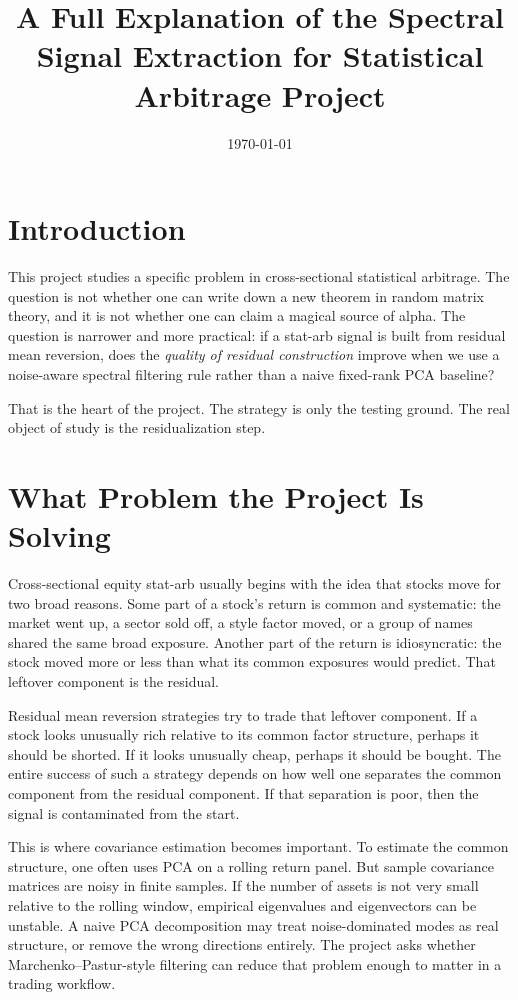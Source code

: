 \documentclass[11pt]{article}
\title{\textbf{A Full Explanation of the Spectral Signal Extraction for Statistical Arbitrage Project}}
\author{}
\date{\today}
\begin{document}
\maketitle
\thispagestyle{empty}

\section*{Introduction}

This project studies a specific problem in cross-sectional statistical
arbitrage. The question is not whether one can write down a new theorem in
random matrix theory, and it is not whether one can claim a magical source of
alpha. The question is narrower and more practical: if a stat-arb signal is
built from residual mean reversion, does the \emph{quality of residual
construction} improve when we use a noise-aware spectral filtering rule rather
than a naive fixed-rank PCA baseline?

That is the heart of the project. The strategy is only the testing ground. The
real object of study is the residualization step.

\section*{What Problem the Project Is Solving}

Cross-sectional equity stat-arb usually begins with the idea that stocks move
for two broad reasons. Some part of a stock's return is common and systematic:
the market went up, a sector sold off, a style factor moved, or a group of
names shared the same broad exposure. Another part of the return is
idiosyncratic: the stock moved more or less than what its common exposures would
predict. That leftover component is the residual.

Residual mean reversion strategies try to trade that leftover component. If a
stock looks unusually rich relative to its common factor structure, perhaps it
should be shorted. If it looks unusually cheap, perhaps it should be bought.
The entire success of such a strategy depends on how well one separates the
common component from the residual component. If that separation is poor, then
the signal is contaminated from the start.

This is where covariance estimation becomes important. To estimate the common
structure, one often uses PCA on a rolling return panel. But sample covariance
matrices are noisy in finite samples. If the number of assets is not very small
relative to the rolling window, empirical eigenvalues and eigenvectors can be
unstable. A naive PCA decomposition may treat noise-dominated modes as real
structure, or remove the wrong directions entirely. The project asks whether
Marchenko--Pastur-style filtering can reduce that problem enough to matter in a
trading workflow.
\end{document}
